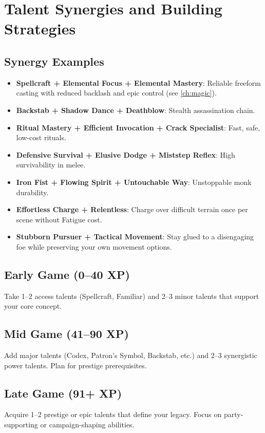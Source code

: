 \section{Talent Synergies and Building Strategies}
\label{sec:talent-synergies}

\subsection*{Synergy Examples}
\label{sec:synergy-examples}
\begin{itemize}
  \item \textbf{Spellcraft + Elemental Focus + Elemental Mastery}: Reliable freeform casting with reduced backlash and epic control (see \ref{ch:magic}).
  \item \textbf{Backstab + Shadow Dance + Deathblow}: Stealth assassination chain.
  \item \textbf{Ritual Mastery + Efficient Invocation + Crack Specialist}: Fast, safe, low-cost rituals.
  \item \textbf{Defensive Survival + Elusive Dodge + Miststep Reflex}: High survivability in melee.
  \item \textbf{Iron Fist + Flowing Spirit + Untouchable Way}: Unstoppable monk durability.
  \item \textbf{Effortless Charge + Relentless}: Charge over difficult terrain once per scene without Fatigue cost.
  \item \textbf{Stubborn Pursuer + Tactical Movement}: Stay glued to a disengaging foe while preserving your own movement options.
\end{itemize}

\subsection*{Early Game (0–40 XP)}
\label{sec:early-game-talents}
Take 1–2 access talents (Spellcraft, Familiar) and 2–3 minor talents that support your core concept.

\subsection*{Mid Game (41–90 XP)}
\label{sec:mid-game-talents}
Add major talents (Codex, Patron’s Symbol, Backstab, etc.) and 2–3 synergistic power talents. Plan for prestige prerequisites.

\subsection*{Late Game (91+ XP)}
\label{sec:late-game-talents}
Acquire 1–2 prestige or epic talents that define your legacy. Focus on party-supporting or campaign-shaping abilities.


